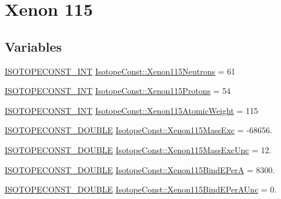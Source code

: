 \hypertarget{group___isotope_const-_xenon-_xe115}{}\section{Xenon 115}
\label{group___isotope_const-_xenon-_xe115}
\subsection*{Variables}
\begin{DoxyCompactItemize}
\item 
\mbox{\hyperlink{group___isotope_const-_macros_ga5f18360b3e99483a35c32d789e62621c}{I\+S\+O\+T\+O\+P\+E\+C\+O\+N\+S\+T\+\_\+\+I\+NT}} \mbox{\hyperlink{group___isotope_const-_xenon-_xe115_ga1157cb9b195a8e8d5aa4dedfd1c3953c}{Isotope\+Const\+::\+Xenon115\+Neutrons}} = 61
\item 
\mbox{\hyperlink{group___isotope_const-_macros_ga5f18360b3e99483a35c32d789e62621c}{I\+S\+O\+T\+O\+P\+E\+C\+O\+N\+S\+T\+\_\+\+I\+NT}} \mbox{\hyperlink{group___isotope_const-_xenon-_xe115_ga5c8eeceba50994735fff2d5b11ed536f}{Isotope\+Const\+::\+Xenon115\+Protons}} = 54
\item 
\mbox{\hyperlink{group___isotope_const-_macros_ga5f18360b3e99483a35c32d789e62621c}{I\+S\+O\+T\+O\+P\+E\+C\+O\+N\+S\+T\+\_\+\+I\+NT}} \mbox{\hyperlink{group___isotope_const-_xenon-_xe115_gae1a040892680ed3ac25396e32496966f}{Isotope\+Const\+::\+Xenon115\+Atomic\+Weight}} = 115
\item 
\mbox{\hyperlink{group___isotope_const-_macros_ga8f45a7272ce02c0b4c65c44636ed719a}{I\+S\+O\+T\+O\+P\+E\+C\+O\+N\+S\+T\+\_\+\+D\+O\+U\+B\+LE}} \mbox{\hyperlink{group___isotope_const-_xenon-_xe115_ga3df931cd1f0b37c7b0897185d8594af9}{Isotope\+Const\+::\+Xenon115\+Mass\+Exc}} = -\/68656.
\item 
\mbox{\hyperlink{group___isotope_const-_macros_ga8f45a7272ce02c0b4c65c44636ed719a}{I\+S\+O\+T\+O\+P\+E\+C\+O\+N\+S\+T\+\_\+\+D\+O\+U\+B\+LE}} \mbox{\hyperlink{group___isotope_const-_xenon-_xe115_gab0d2b79c7d2548d1fdd2216131ff8072}{Isotope\+Const\+::\+Xenon115\+Mass\+Exc\+Unc}} = 12.
\item 
\mbox{\hyperlink{group___isotope_const-_macros_ga8f45a7272ce02c0b4c65c44636ed719a}{I\+S\+O\+T\+O\+P\+E\+C\+O\+N\+S\+T\+\_\+\+D\+O\+U\+B\+LE}} \mbox{\hyperlink{group___isotope_const-_xenon-_xe115_ga3640ad82dd971b208829a90e38a7e90b}{Isotope\+Const\+::\+Xenon115\+Bind\+E\+PerA}} = 8300.
\item 
\mbox{\hyperlink{group___isotope_const-_macros_ga8f45a7272ce02c0b4c65c44636ed719a}{I\+S\+O\+T\+O\+P\+E\+C\+O\+N\+S\+T\+\_\+\+D\+O\+U\+B\+LE}} \mbox{\hyperlink{group___isotope_const-_xenon-_xe115_gae3dfa61199d45b97910d6df3ac87ab99}{Isotope\+Const\+::\+Xenon115\+Bind\+E\+Per\+A\+Unc}} = 0.

\end{DoxyCompactItemize}
